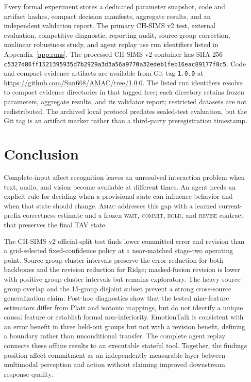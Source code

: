 \documentclass[journal]{IEEEtran}
\newcommand{\method}{\textsc{Amac}}
\begin{document}
Every formal experiment stores a dedicated parameter snapshot, code and artifact hashes, compact decision manifests, aggregate results, and an independent validation report. The primary CH-SIMS v2 test, external evaluation, competitive diagnostic, reporting audit, source-group correction, nonlinear robustness study, and agent replay use run identifiers listed in Appendix~\ref{app:runs}. The processed CH-SIMS v2 container has SHA-256 \texttt{c5327d86ff152139\allowbreak{}5935d7b2929a3d3a\allowbreak{}56a9770a32edeb1f\allowbreak{}eb16eac89177f8c5}. Code and compact evidence artifacts are available from Git tag \texttt{1.0.0} at \url{https://github.com/Sun668/AMAC/tree/1.0.0}. The listed run identifiers resolve to compact evidence directories in that tagged tree; each directory retains frozen parameters, aggregate results, and its validator report; restricted datasets are not redistributed. The archived local protocol predates sealed-test evaluation, but the Git tag is an artifact marker rather than a third-party preregistration timestamp.

\section{Conclusion}

Complete-input affect recognition leaves an unresolved interaction problem when text, audio, and vision become available at different times. An agent needs an explicit rule for deciding when a provisional state can influence behavior and when that state should change. \method{} addresses this gap with a learned current-prefix correctness estimate and a frozen \textsc{wait}, \textsc{commit}, \textsc{hold}, and \textsc{revise} contract that preserves the final TAV state.

The CH-SIMS v2 official-split test finds lower committed error and revision than a grid-selected fixed-confidence policy at a near-matched stage-two operating point. Source-group cluster intervals preserve the error reduction for both backbones and the revision reduction for Ridge; masked-fusion revision is lower with positive group-cluster intervals but remains exploratory. The heavy source-group overlap and the 15-group disjoint subset prevent a strong cross-source generalization claim. Post-hoc diagnostics show that the tested nine-feature estimators differ from Platt and isotonic mappings, but do not identify a unique causal feature or establish formal non-inferiority. EmotionTalk is consistent with an error benefit in three held-out groups but not with a revision benefit, defining a boundary rather than unconditional transfer. The complete agent replay connects these offline results to an executable stateful tool. Together, the findings position affect commitment as an independently measurable layer between multimodal perception and action without claiming improved downstream response quality.
\end{document}
